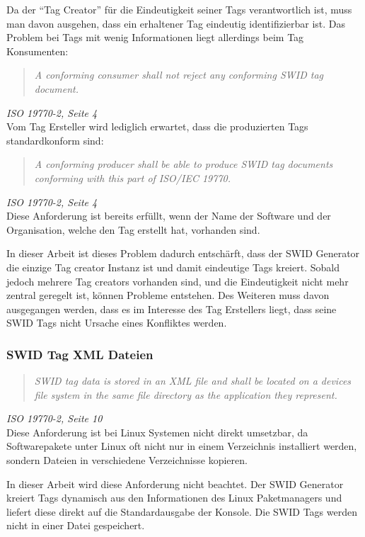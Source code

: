 Da der \enquote{Tag Creator} für die Eindeutigkeit seiner Tags verantwortlich
ist, muss man davon ausgehen, dass ein erhaltener Tag eindeutig identifizierbar
ist. Das Problem bei Tags mit wenig Informationen liegt allerdings beim Tag
Konsumenten:
\begin{quote}
\textit{A conforming consumer shall not reject any conforming SWID tag
document.}
\end{quote}
\textit{ISO 19770-2\cite{iso19770-2}, Seite 4}\\

Vom Tag Ersteller wird lediglich erwartet, dass die produzierten Tags
standardkonform sind:
\begin{quote}
\textit{A conforming producer shall be able to produce SWID tag documents
conforming with this part of ISO/IEC 19770.}
\end{quote}
\textit{ISO 19770-2\cite{iso19770-2}, Seite 4}\\

Diese Anforderung ist bereits erfüllt, wenn der Name der Software und der
Organisation, welche den Tag erstellt hat, vorhanden sind.

In dieser Arbeit ist dieses Problem dadurch entschärft, dass der SWID Generator
die einzige Tag creator Instanz ist und damit eindeutige Tags kreiert. Sobald
jedoch mehrere Tag creators vorhanden sind, und die Eindeutigkeit nicht mehr
zentral geregelt ist, können Probleme entstehen. Des Weiteren muss davon
ausgegangen werden, dass es im Interesse des Tag Erstellers liegt, dass seine
SWID Tags nicht Ursache eines Konfliktes werden.

\subsubsection{SWID Tag XML Dateien}
\begin{quote}
\textit{SWID tag data is stored in an XML file and shall be located on a devices
file system in the same file directory as the application they represent.}
\end{quote}
\textit{ISO 19770-2\cite{iso19770-2}, Seite 10}\\

Diese Anforderung ist bei Linux Systemen nicht direkt umsetzbar, da
Softwarepakete unter Linux oft nicht nur in einem Verzeichnis installiert
werden, sondern Dateien in verschiedene Verzeichnisse kopieren.

In dieser Arbeit wird diese Anforderung nicht beachtet. Der SWID Generator
kreiert Tags dynamisch aus den Informationen des Linux Paketmanagers
und liefert diese direkt auf die Standardausgabe der Konsole. Die SWID Tags
werden nicht in einer Datei gespeichert. 

